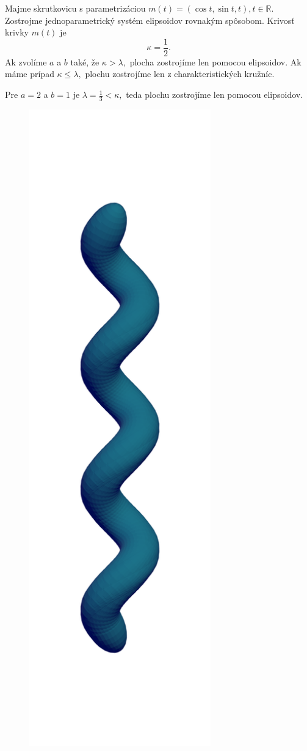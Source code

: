 \begin{example}[Skrutkovica]
\label{ex:helix}
Majme skrutkovicu s parametrizáciou $m(t)=(\cos t, \sin t, t), t \in \mathbb{R}.$ Zostrojme jednoparametrický systém elipsoidov rovnakým spôsobom.
Krivosť krivky $m(t)$ je
$$
\kappa = \frac{1}{2}.
$$
Ak zvolíme $a$ a $b$ také, že $\kappa > \lambda, $ plocha zostrojíme len pomocou elipsoidov.
Ak máme prípad $\kappa \leq \lambda,$ plochu zostrojíme len z charakteristických kružníc. 

Pre $a = 2$ a $b = 1$ je $\lambda = \frac{1}{3} < \kappa,$ teda plochu zostrojíme len pomocou elipsoidov.
\begin{figure}[H]
	\centering
	\includegraphics[angle=90, width=0.7\textwidth]{images/helix_ellipsoids.png}

\end{figure}
\end{example}
